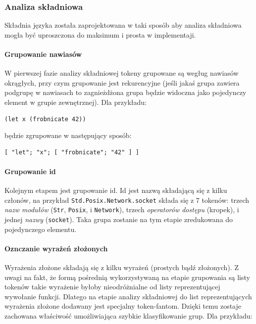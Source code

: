 \documentclass[11pt,oneside,a4paper,titlepage,onecolumn]{article}
\begin{document}
\subsubsection{Analiza składniowa}

Składnia języka została zaprojektowana w taki sposób aby analiza składniowa mogła być uproszczona do maksimum
i prosta w implementaji.

\paragraph{Grupowanie nawiasów}

W pierwszej fazie analizy składniowej tokeny grupowane są wegług nawiasów okrągłych, przy czym grupowanie jest
rekurencyjne (jeśli jakaś grupa zawiera podgrupę w nawiasach to zagnieżdżona grupa będzie widoczna jako
pojedynczy element w grupie zewnętrznej).
Dla przykładu:

\begin{lstlisting}
(let x (frobnicate 42))
\end{lstlisting}

będzie zgrupowane w następujący sposób:

\begin{lstlisting}
[ "let"; "x"; [ "frobnicate"; "42" ] ]
\end{lstlisting}

\paragraph{Grupowanie id}

Kolejnym etapem jest grupowanie id. Id jest nazwą składającą się z kilku członów, na przykład
\texttt{Std.Posix.Network.socket} składa się z 7 tokenów: trzech \emph{nazw modułów} (\texttt{Str},
\texttt{Posix}, i \texttt{Network}), trzech \emph{operatorów dostępu} (kropek), i jednej \emph{nazwy}
(\texttt{socket}).
Taka grupa zostanie na tym etapie zredukowana do pojedynczego elementu.

\paragraph{Oznczanie wyrażeń złożonych}

Wyrażenia złożone składają się z kilku wyrażeń (prostych bądź złożonych). Z uwagi na fakt, że formą pośrednią
wykorzystywaną na etapie grupowania są listy tokenów takie wyrażenie byłoby nieodróżnialne od listy
reprezentującej wywołanie funkcji. Dlatego na etapie analizy składniowej do list reprezentujących wyrażenia
złożone dodawany jest specjalny token-fantom. Dzięki temu zostaje zachowana właściwość umożliwiająca szybkie
klasyfikowanie grup. Dla przykładu:
\end{document}
